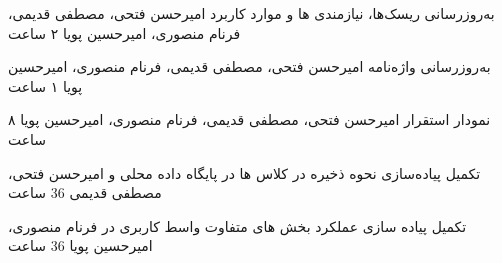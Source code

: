   
 		  به‌روزرسانی ریسک‌ها، نیازمندی ها و موارد کاربرد
 			  امیرحسن فتحی، مصطفی قدیمی، فرنام منصوری، امیرحسین پویا
 			   ۲ ساعت
 			 
 
		  به‌روزرسانی واژه‌نامه
			   امیرحسن فتحی، مصطفی قدیمی، فرنام منصوری، امیرحسین پویا
			  ۱ ساعت

	 	  نمودار استقرار
		   امیرحسن فتحی، مصطفی قدیمی، فرنام منصوری، امیرحسین پویا
		   ۸ ساعت
 

 		  تکمیل پیاده‌سازی نحوه ذخیره در کلاس ها در پایگاه داده محلی و 
 			  امیرحسن فتحی، مصطفی قدیمی
		 	  36 ساعت

 		  تکمیل پیاده سازی عملکرد بخش های متفاوت واسط کاربری در 
 			  فرنام منصوری، امیرحسین پویا
		 	  36 ساعت
 